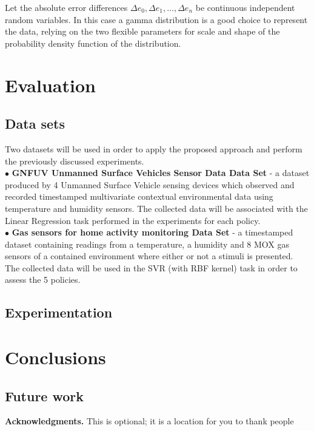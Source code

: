 \documentclass{mpaper}
\begin{document}
Let the absolute error differences $\Delta e_0, \Delta e_1, \dotsc ,\Delta e_n $ be continuous independent random variables. In this case a gamma distribution is a good choice to represent the data, relying on the two flexible parameters for scale and shape of the probability density function of the distribution.

\section{Evaluation}

\subsection*{Data sets}
Two datasets will be used in order to apply the proposed approach and perform the previously discussed experiments.
\\$\bullet$ \textbf{GNFUV Unmanned Surface Vehicles Sensor Data Data Set} \cite{harth2018} - a dataset produced by 4 Unmanned Surface Vehicle sensing devices which observed and recorded timestamped multivariate contextual environmental data using temperature and humidity sensors. The collected data will be associated with the Linear Regression task performed in the experiments for each policy.
\\$\bullet$ \textbf{Gas sensors for home activity monitoring Data Set } \cite{HUERTA2016169} - a timestamped dataset containing readings from a temperature, a humidity and 8 MOX gas sensors of a contained environment where either or not a stimuli is presented. The collected data will be used in the SVR (with RBF kernel) task in order to assess the 5 policies.
\subsection{Experimentation}

\section{Conclusions}

\subsection*{Future work}

{\bf Acknowledgments.}
This is optional; it is a location for you to thank people



\end{document}
